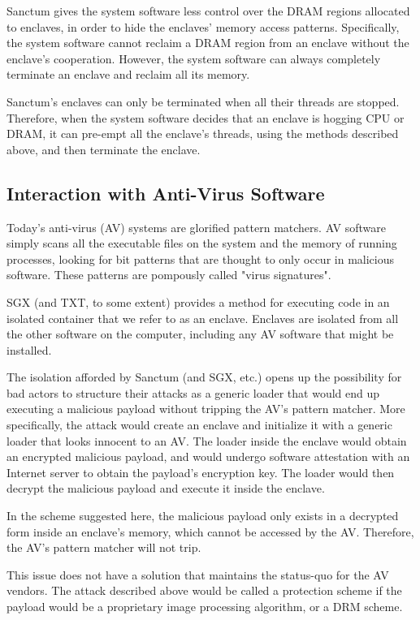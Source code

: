 Sanctum gives the system software less control over the DRAM regions allocated
to enclaves, in order to hide the enclaves' memory access patterns.
Specifically, the system software cannot reclaim a DRAM region from an enclave
without the enclave's cooperation. However, the system software can always
completely terminate an enclave and reclaim all its memory.

Sanctum's enclaves can only be terminated when all their threads are stopped.
Therefore, when the system software decides that an enclave is hogging CPU or
DRAM, it can pre-empt all the enclave's threads, using the methods described
above, and then terminate the enclave.


\subsection{Interaction with Anti-Virus Software}

Today's anti-virus (AV) systems are glorified pattern matchers. AV software
simply scans all the executable files on the system and the memory of running
processes, looking for bit patterns that are thought to only occur in malicious
software. These patterns are pompously called "virus signatures".

SGX (and TXT, to some extent) provides a method for executing code in an
isolated container that we refer to as an enclave. Enclaves are isolated from
all the other software on the computer, including any AV software that might be
installed.

The isolation afforded by Sanctum (and SGX, etc.) opens up the possibility for
bad actors to structure their attacks as a generic loader that would end up
executing a malicious payload without tripping the AV's pattern matcher.  More
specifically, the attack would create an enclave and initialize it with a
generic loader that looks innocent to an AV. The loader inside the enclave
would obtain an encrypted malicious payload, and would undergo software
attestation with an Internet server to obtain the payload's encryption key. The
loader would then decrypt the malicious payload and execute it inside the
enclave.

In the scheme suggested here, the malicious payload only exists in a decrypted
form inside an enclave's memory, which cannot be accessed by the AV. Therefore,
the AV's pattern matcher will not trip.

This issue does not have a solution that maintains the status-quo for the AV
vendors. The attack described above would be called a protection scheme if the
payload would be a proprietary image processing algorithm, or a DRM scheme.


